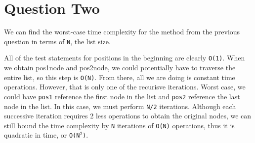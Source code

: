 \documentclass[11pt,letterpaper]{article}
\begin{document}
\section{Question Two} 
We can find the worst-case time complexity for the method from the previous question in terms of \texttt{N}, the list size. 

All of the test statements for positions in the beginning are clearly \texttt{O(1)}. When we obtain pos1node and pos2node, we could potentially have to traverse the entire list, so this step is \texttt{O(N)}. From there, all we are doing is constant time operations. However, that is only one of the recurisve iterations. Worst case, we could have \texttt{pos1} reference the first node in the list and \texttt{pos2} reference the last node in the list. In this case, we must perform \texttt{N/2} iterations. Although each successive iteration requires 2 less operations to obtain the original nodes, we can still bound the time complexity by \texttt{N} iterations of \texttt{O(N)} operations, thus it is quadratic in time, or \texttt{O(N$^2$)}.
\end{document}
